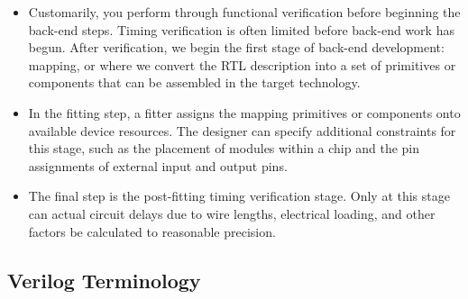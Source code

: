 \documentclass[10pt,a4paper]{article}
\begin{document}
\begin{itemize}
\begin{itemize}
\item Customarily, you perform through functional verification before beginning the back-end steps. Timing verification is often limited before back-end work has begun. After verification, we begin the first stage of back-end development: mapping, or where we convert the RTL description into a set of primitives or components that can be assembled in the target technology.
\item In the fitting step, a fitter assigns the mapping primitives or components onto available device resources. The designer can specify additional constraints for this stage, such as the placement of modules within a chip and the pin assignments of external input and output pins.
\item The final step is the post-fitting timing verification stage. Only at this stage can actual circuit delays due to wire lengths, electrical loading, and other factors be calculated to reasonable precision.
\end{itemize}
\end{itemize}
\subsection{Verilog Terminology}
\end{document}
